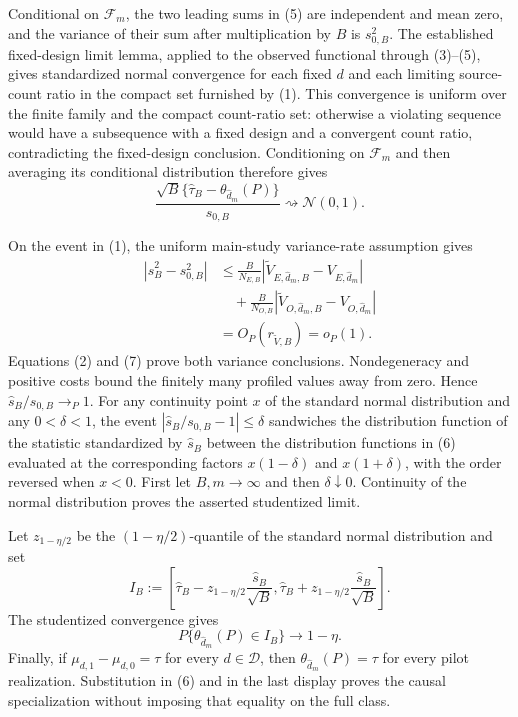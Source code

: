 Conditional on \(\mathcal F_m\), the two leading sums in (5) are independent and mean zero, and the variance of their sum after multiplication by \(B\) is \(s_{0,B}^2\).  The established fixed-design limit lemma, applied to the observed functional through (3)--(5), gives standardized normal convergence for each fixed \(d\) and each limiting source-count ratio in the compact set furnished by (1).  This convergence is uniform over the finite family and the compact count-ratio set: otherwise a violating sequence would have a subsequence with a fixed design and a convergent count ratio, contradicting the fixed-design conclusion.  Conditioning on \(\mathcal F_m\) and then averaging its conditional distribution therefore gives
\[
 \frac{\sqrt B\{\widehat\tau_B-\theta_{\widehat d_m}(P)\}}
 {s_{0,B}}\rightsquigarrow\mathcal N(0,1).                                \tag{6}
\]

On the event in (1), the uniform main-study variance-rate assumption gives
\[
\begin{aligned}
 |\widehat s_B^2-s_{0,B}^2|
 &\le \frac B{N_{E,B}}
 |\widetilde V_{E,\widehat d_m,B}-V_{E,\widehat d_m}|\\
 &\quad+\frac B{N_{O,B}}
 |\widetilde V_{O,\widehat d_m,B}-V_{O,\widehat d_m}|\\
 &=O_P(r_{\widetilde V,B})=o_P(1).
\end{aligned}                                                              \tag{7}
\]
Equations (2) and (7) prove both variance conclusions.  Nondegeneracy and positive costs bound the finitely many profiled values away from zero.  Hence \(\widehat s_B/s_{0,B}\to_P1\).  For any continuity point \(x\) of the standard normal distribution and any \(0<\delta<1\), the event \(|\widehat s_B/s_{0,B}-1|\le\delta\) sandwiches the distribution function of the statistic standardized by \(\widehat s_B\) between the distribution functions in (6) evaluated at the corresponding factors \(x(1-\delta)\) and \(x(1+\delta)\), with the order reversed when \(x<0\).  First let \(B,m\to\infty\) and then \(\delta\downarrow0\).  Continuity of the normal distribution proves the asserted studentized limit.

Let \(z_{1-\eta/2}\) be the \((1-\eta/2)\)-quantile of the standard normal distribution and set
\[
 I_B:=\left[
 \widehat\tau_B-z_{1-\eta/2}\frac{\widehat s_B}{\sqrt B},
 \widehat\tau_B+z_{1-\eta/2}\frac{\widehat s_B}{\sqrt B}
 \right].
\]
The studentized convergence gives
\[
 P\{\theta_{\widehat d_m}(P)\in I_B\}\longrightarrow1-\eta.
\]
Finally, if \(\mu_{d,1}-\mu_{d,0}=\tau\) for every \(d\in\mathcal D\), then \(\theta_{\widehat d_m}(P)=\tau\) for every pilot realization.  Substitution in (6) and in the last display proves the causal specialization without imposing that equality on the full class.
